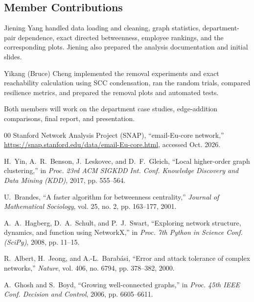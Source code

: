 \documentclass[conference]{IEEEtran}
\begin{document}
\subsection{Member Contributions}
Jiening Yang handled data loading and cleaning, graph statistics, department-pair dependence, exact directed betweenness, employee rankings, and the corresponding plots. Jiening also prepared the analysis documentation and initial slides.

Yikang (Bruce) Cheng implemented the removal experiments and exact reachability calculation using SCC condensation, ran the random trials, compared resilience metrics, and prepared the removal plots and automated tests.

Both members will work on the department case studies, edge-addition comparisons, final report, and presentation.

\begin{thebibliography}{00}
Stanford Network Analysis Project (SNAP), ``email-Eu-core network,'' \url{https://snap.stanford.edu/data/email-Eu-core.html}, accessed Oct. 2026.

H.~Yin, A.~R.~Benson, J.~Leskovec, and D.~F.~Gleich, ``Local higher-order graph clustering,'' in \textit{Proc. 23rd ACM SIGKDD Int. Conf. Knowledge Discovery and Data Mining (KDD)}, 2017, pp. 555--564.

U.~Brandes, ``A faster algorithm for betweenness centrality,'' \textit{Journal of Mathematical Sociology}, vol. 25, no. 2, pp. 163--177, 2001.

A.~A.~Hagberg, D.~A.~Schult, and P.~J.~Swart, ``Exploring network structure, dynamics, and function using NetworkX,'' in \textit{Proc. 7th Python in Science Conf. (SciPy)}, 2008, pp. 11--15.

R.~Albert, H.~Jeong, and A.-L.~Barab{\'a}si, ``Error and attack tolerance of complex networks,'' \textit{Nature}, vol. 406, no. 6794, pp. 378--382, 2000.

A.~Ghosh and S.~Boyd, ``Growing well-connected graphs,'' in \textit{Proc. 45th IEEE Conf. Decision and Control}, 2006, pp. 6605--6611.
\end{thebibliography}
\end{document}
